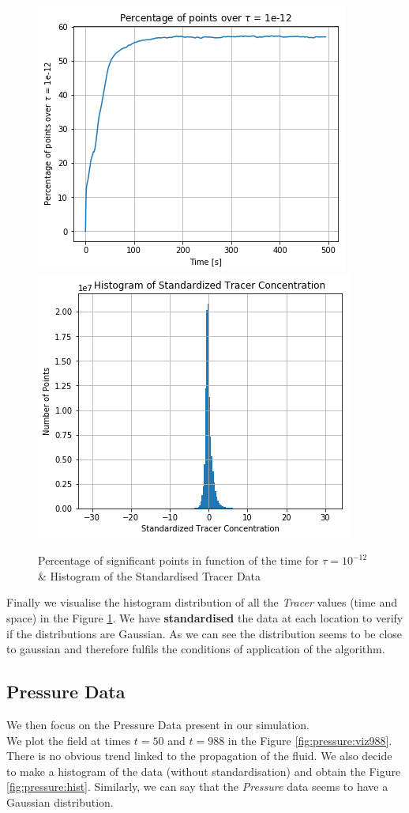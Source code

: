 \begin{figure}[h]
\centering
    \includegraphics[width = 0.45 \textwidth]{figures/DataAnalysis/SumDataTime}
    ~
    \includegraphics[width = 0.45 \textwidth]{figures/DataAnalysis/HistoGramTracerSTD}
    \caption{Percentage of significant points in function of the time for $\tau = 10^{-12}$ \& Histogram of the Standardised Tracer Data}
    \label{fig:sumtime}
\end{figure}

Finally we visualise the histogram distribution of all the \textit{Tracer} values (time and space) in the Figure \ref{fig:sumtime}. We have \textbf{standardised} the data at each location to verify if the distributions are Gaussian. As we can see the distribution seems to be close to gaussian and therefore fulfils the conditions of application of the algorithm. 

\subsection{Pressure Data}

We then focus on the Pressure Data present in our simulation. \\ 

We plot the field at times $t=50 $ and $t= 988$ in the Figure \ref{fig:pressure:viz988}. There is no obvious trend linked to the propagation of the fluid. We also decide to make a histogram of the data (without standardisation) and obtain the Figure \ref{fig:pressure:hist}. Similarly, we can say that the \textit{Pressure} data seems to have a Gaussian distribution. 


